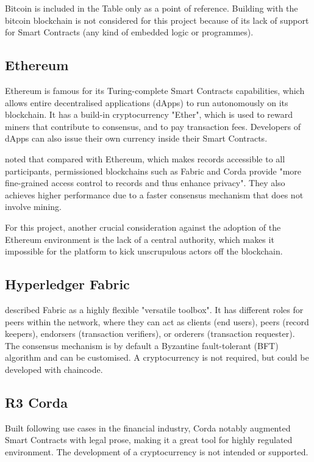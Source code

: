 Bitcoin is included in the Table only as a point of reference. Building with the bitcoin
blockchain is not considered for this project because of its lack of support for Smart
Contracts (any kind of embedded logic or programmes).

\subsection*{Ethereum}

Ethereum is famous for its Turing-complete Smart Contracts capabilities, which allows entire
decentralised applications (dApps) to run autonomously on its blockchain. It has a build-in cryptocurrency
"Ether", which is used to reward miners that contribute to consensus, and to pay transaction fees.
Developers of dApps can also issue their own currency inside their Smart Contracts.

\citet[p.3-4]{valenta2017comparison} noted that compared with Ethereum, which makes records accessible
to all participants, permissioned blockchains such as Fabric and Corda provide "more fine-grained access
control to records and thus enhance privacy".
They also achieves higher performance due to a faster consensus mechanism that does not involve mining.

For this project, another crucial consideration against the adoption of the Ethereum environment is the
lack of a central authority, which makes it impossible for the platform to kick unscrupulous actors off
the blockchain.

\subsection*{Hyperledger Fabric}

\citet[p.7]{valenta2017comparison} described Fabric as a highly flexible "versatile toolbox". It
has different roles for peers within the network, where they can act as clients (end users), peers
(record keepers), endorsers (transaction verifiers), or orderers (transaction requester). The
consensus mechanism is by default a Byzantine fault-tolerant (BFT) algorithm and can be customised.
A cryptocurrency is not required, but could be developed with chaincode.

\subsection*{R3 Corda}

Built following use cases in the financial industry, Corda notably augmented Smart Contracts
with legal prose, making it a great tool for highly regulated environment. The development of
a cryptocurrency is not intended or supported. \citep{valenta2017comparison}

